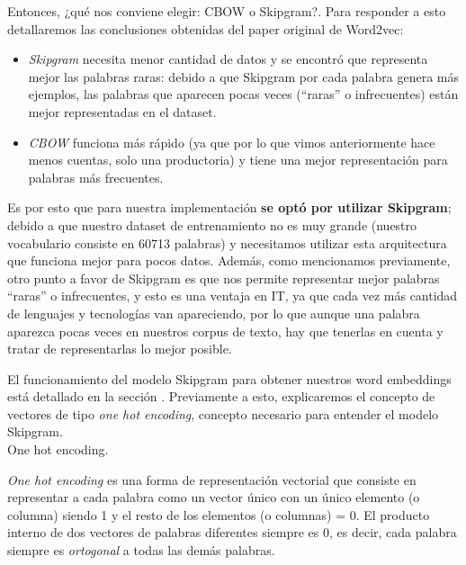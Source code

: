 \documentclass[12pt,a4paper]{article}
\makeatletter
\renewcommand\paragraph{\@startsection{paragraph}{4}{\z@}
            {-2.5ex\@plus -1ex \@minus -.25ex}
            {1.25ex \@plus .25ex}
            {\normalfont\normalsize\bfseries}}
\makeatother
\begin{document}
\begin{sloppypar}
\begin{itemize}
\end{itemize}

Entonces, ¿qué nos conviene elegir: CBOW o Skipgram?. Para responder a esto detallaremos las conclusiones obtenidas del paper original de Word2vec\cite{NLP_11}:
\begin{itemize}
\item \textit{Skipgram} necesita menor cantidad de datos y se encontró que representa mejor las palabras raras: debido a que Skipgram por cada palabra genera más ejemplos, las palabras que aparecen pocas veces (“raras” o infrecuentes) están mejor representadas en el dataset. 
\item \textit{CBOW} funciona más rápido (ya que por lo que vimos anteriormente hace menos cuentas, solo una productoria) y tiene una mejor representación para palabras más frecuentes.
\end{itemize}

Es por esto que para nuestra implementación \textbf{se optó por utilizar Skipgram}; debido a que nuestro dataset de entrenamiento no es muy grande (nuestro vocabulario consiste en 60713 palabras) y necesitamos utilizar esta arquitectura que funciona mejor para pocos datos. Además, como mencionamos previamente, otro punto a favor de Skipgram es que {nos permite representar mejor palabras “raras” o infrecuentes}, y esto es una ventaja en IT, ya que cada vez más cantidad de lenguajes y tecnologías van apareciendo, por lo que aunque una palabra aparezca pocas veces en nuestros corpus de texto, hay que tenerlas en cuenta y tratar de representarlas lo mejor posible.

El funcionamiento del modelo Skipgram para obtener nuestros word embeddings está detallado en la sección \textit{}. Previamente a esto, explicaremos el concepto de vectores de tipo \textit{one hot encoding}, concepto necesario para entender el modelo Skipgram.
\\

\paragraph{One hot encoding.}\label{one_hot_enc}

\textit{One hot encoding} es una forma de representación vectorial que consiste en representar a cada palabra como un vector único con un único elemento (o columna) siendo 1 y el resto de los elementos (o columnas) = 0. El producto interno de dos vectores de palabras diferentes siempre es 0, es decir, cada palabra siempre es \textit{ortogonal} a todas las demás palabras\cite{NLP_9}.


\end{sloppypar}
\end{document}
